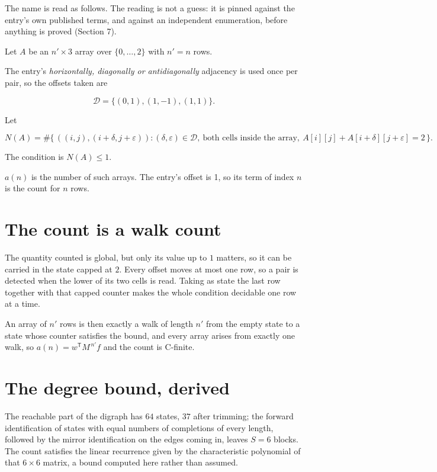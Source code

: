 \documentclass[11pt]{article}
\theoremstyle{definition}
\begin{document}
The name is read as follows. The reading is not a guess: it is pinned against the entry's own published terms, and against an independent enumeration, before anything is proved (Section 7).

Let $A$ be an $n' \times 3$ array over $\{0,\dots,2\}$ with $n' = n$ rows.

The entry's {\itshape horizontally, diagonally or antidiagonally} adjacency is used once per pair, so the offsets taken are

\[\mathcal{D} = \{(0,1), (1,-1), (1,1)\}.\]

Let

\[N(A) = \#\bigl\{\,((i,j),(i{+}\delta,j{+}\varepsilon)) : (\delta,\varepsilon) \in \mathcal{D},\ \text{both cells inside the array},\ A[i][j] + A[i{+}\delta][j{+}\varepsilon] = 2\,\bigr\}.\]

The condition is $N(A) \le 1$.

$a(n)$ is the number of such arrays. The entry's offset is 1, so its term of index $n$ is the count for $n$ rows.

\section{The count is a walk count}

The quantity counted is global, but only its value up to $1$ matters, so it can be carried in the state capped at $2$. Every offset moves at most one row, so a pair is detected when the lower of its two cells is read. Taking as state the last row together with that capped counter makes the whole condition decidable one row at a time.

An array of $n'$ rows is then exactly a walk of length $n'$ from the empty state to a state whose counter satisfies the bound, and every array arises from exactly one walk, so $a(n) = w^{\mathsf T}M^{\,n'}f$ and the count is C-finite.

\section{The degree bound, derived}

The reachable part of the digraph has $64$ states, $37$ after trimming; the forward identification of states with equal numbers of completions of every length, followed by the mirror identification on the edges coming in, leaves $S = 6$ blocks. The count satisfies the linear recurrence given by the characteristic polynomial of that $6\times6$ matrix, a bound computed here rather than assumed.
\end{document}
